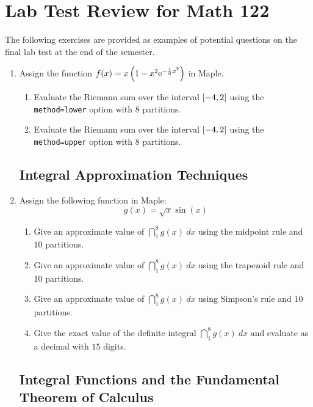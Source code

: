\chapter{Lab Test Review for Math 122}

The following exercises are provided as examples of potential questions on the final lab test at the end of the semester.

\begin{enumerate}

\section*{Riemann Sums}

\item Assign the function $f(x) = x \left(1-x^2 {\rm e}^{-\frac{1}{6}x^2}\right)$ in Maple.
	\begin{enumerate}
	\item Evaluate the Riemann sum over the interval $\left[-4,2\right]$ using the \texttt{method=lower} option with $8$ partitions.
	\item Evaluate the Riemann sum over the interval $\left[-4,2\right]$ using the \texttt{method=upper} option with $8$ partitions.
	\end{enumerate}
	
\section*{Integral Approximation Techniques}

\item Assign the following function in Maple: \[ g(x) = \sqrt{x} \sin(x) \]
	\begin{enumerate}
	\item Give an approximate value of $\dint_{1}^{8} g(x)~dx$ using the midpoint rule and $10$ partitions.
	\item Give an approximate value of $\dint_{1}^{8} g(x)~dx$ using the trapezoid rule and $10$ partitions.
	\item Give an approximate value of $\dint_{1}^{8} g(x)~dx$ using Simpson's rule and $10$ partitions.
	\item Give the exact value of the definite integral $\dint_{1}^{8} g(x)~dx$ and evaluate as a decimal with $15$ digits.
	\end{enumerate}

\section*{Integral Functions and the Fundamental Theorem of Calculus}


\end{enumerate}
